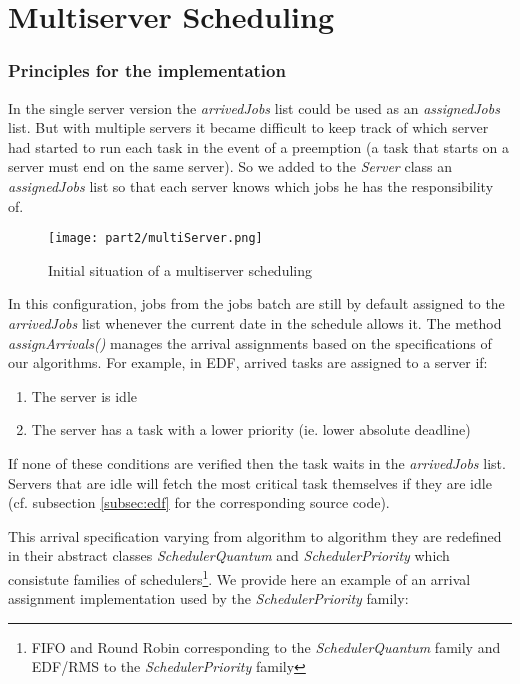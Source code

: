 \documentclass[./report.tex]{subfiles}
\begin{document}
\part{Multiserver Scheduling}

\section{Principles for the implementation}

In the single server version the \textit{arrivedJobs} list could be used as an \textit{assignedJobs} list. But with multiple servers it became difficult to keep track of which server had started to run each task in the event of a preemption (a task that starts on a server must end on the same server). So we added to the \textit{Server} class an \textit{assignedJobs} list so that each server knows which jobs he has the responsibility of.

\begin{figure}[!h]
	\center
	\texttt{[image: part2/multiServer.png]}
	\caption{Initial situation of a multiserver scheduling}
	\label{fig:multiServer_init} 
\end{figure}

In this configuration, jobs from the jobs batch are still by default assigned to the \textit{arrivedJobs} list whenever the current date in the schedule allows it. The method \textit{assignArrivals()} manages the arrival assignments based on the specifications of our algorithms. For example, in EDF, arrived tasks are assigned to a server if:
\begin{enumerate}
	\item The server is idle
	\item The server has a task with a lower priority (ie. lower absolute deadline)\\
\end{enumerate}

If none of these conditions are verified then the task waits in the \textit{arrivedJobs} list. Servers that are idle will fetch the most critical task themselves if they are idle (cf. subsection \ref{subsec:edf} for the corresponding source code).

\newpage
This arrival specification varying from algorithm to algorithm they are redefined in their abstract classes \textit{SchedulerQuantum} and \textit{SchedulerPriority} which consistute families of schedulers\footnote{FIFO and Round Robin corresponding to the \textit{SchedulerQuantum} family and EDF/RMS to the \textit{SchedulerPriority} family}. We provide here an example of an arrival assignment implementation used by the \textit{SchedulerPriority} family:
\end{document}
